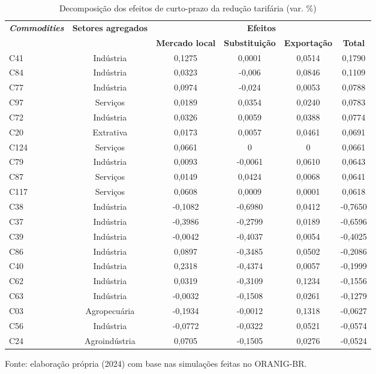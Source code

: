 \begin{table}[H]
	\centering
	\small
	\begin{threeparttable}
		\caption{Decomposição dos efeitos de curto-prazo da redução tarifária (var. \%)} \label{tab:fandecomp}
		\begin{tabular}{lccccc}
		\hline
		\multirow{2}{*}{\textit{\textbf{Commodities}}} &
		\multicolumn{1}{c}{\multirow{2}{*}{\textbf{Setores agregados}}} &
		\multicolumn{4}{c}{\textbf{Efeitos}} \\ \cline{3-6} 
		&
		\multicolumn{1}{c}{} &
		\multicolumn{1}{c}{\textbf{Mercado local}} &
		\multicolumn{1}{c}{\textbf{Substituição}} &
		\multicolumn{1}{c}{\textbf{Exportação}} &
		\multicolumn{1}{c}{\textbf{Total}} \\ \hline
		C41  &	Indústria	  &	 0,1275	&  0,0001 &	0,0514	&  0,1790	\\	
        C84  &	Indústria	  &	 0,0323	&  -0,006 &	0,0846	&  0,1109	\\	
		C77  &	Indústria	  &	 0,0974	&  -0,024 &	0,0053	&  0,0788	\\	
		C97  &	Serviços	  &	 0,0189	&  0,0354 &	0,0240	&  0,0783	\\	
		C72  &	Indústria	  &	 0,0326	&  0,0059 &	0,0388	&  0,0774	\\	
		C20  &	Extrativa	  &	 0,0173	&  0,0057 &	0,0461	&  0,0691	\\	
		C124 &	Serviços	  &	 0,0661	&  0      &	0	    &  0,0661	\\	
		C79  &	Indústria	  &	 0,0093	& -0,0061 &	0,0610	&  0,0643	\\	
		C87  & 	Serviços	  &	 0,0149	&  0,0424 &	0,0068	&  0,0641	\\	
		C117 & 	Serviços	  &	 0,0608	&  0,0009 &	0,0001	&  0,0618	\\	\hline
		C38  & 	Indústria	  &	-0,1082	& -0,6980 &	0,0412	& -0,7650	\\	
		C37  &	Indústria	  &	-0,3986	& -0,2799 &	0,0189	& -0,6596	\\	
		C39  & 	Indústria	  &	-0,0042	& -0,4037 &	0,0054	& -0,4025	\\	
		C86  &	Indústria	  &	 0,0897	& -0,3485 &	0,0502	& -0,2086	\\	
		C40  &	Indústria	  &	 0,2318	& -0,4374 &	0,0057	& -0,1999	\\	
		C62  &	Indústria	  &	 0,0319	& -0,3109 &	0,1234	& -0,1556	\\	
		C63  &	Indústria	  &	-0,0032	& -0,1508 &	0,0261	& -0,1279	\\	
		C03  &	Agropecuária  &	-0,1934	& -0,0012 &	0,1318	& -0,0627	\\	
		C56  &	Indústria	  &	-0,0772	& -0,0322 &	0,0521	& -0,0574	\\	
		C24  &	Agroindústria &	 0,0705	& -0,1505 &	0,0276	& -0,0524	\\	\hline

		\end{tabular}
	\begin{tablenotes}
		\footnotesize
		\item Fonte: elaboração própria (2024) com base nas simulações feitas no ORANIG-BR.
	\end{tablenotes}
	\end{threeparttable}
\end{table}
